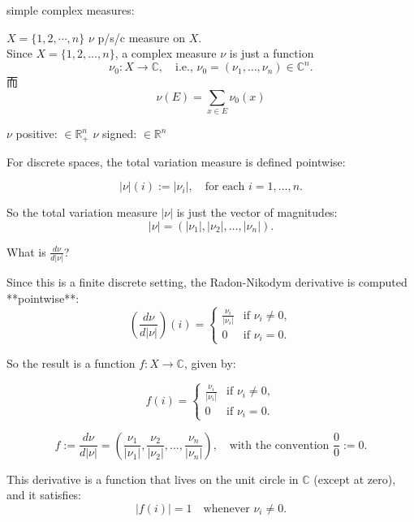 \documentclass[lang=cn,11pt]{elegantbook}
\begin{document}
\begin{example}
    simple complex measures:

$X = \{1,2,\cdots, n \}$
$\nu$ p/s/c measure on $X$.\\


Since \( X = \{1,2,\dots,n\} \), a complex measure \( \nu \) is just a function  
\[
\nu_0: X \to \mathbb{C}, \quad \text{i.e., } \nu_0 = (\nu_1, \dots, \nu_n) \in \mathbb{C}^n.
\]而 \[
\nu (E) = \sum_{x\in E} \nu_0(x)
\]

$\nu$ positive: $ \in \mathbb{R}_+^n$
$\nu$ signed: $ \in \mathbb{R}^n$



For discrete spaces, the total variation measure is defined pointwise:

\[
|\nu|(i) := |\nu_i|, \quad \text{for each } i = 1,\dots,n.
\]

So the total variation measure \( |\nu| \) is just the vector of magnitudes:
\[
|\nu| = (|\nu_1|, |\nu_2|, \dots, |\nu_n|).
\]

What is \( \frac{d\nu}{d|\nu|} \)?

Since this is a finite discrete setting, the Radon-Nikodym derivative is computed **pointwise**:
\[
\left( \frac{d\nu}{d|\nu|} \right)(i) = 
\begin{cases}
\frac{\nu_i}{|\nu_i|} & \text{if } \nu_i \neq 0, \\
0 & \text{if } \nu_i = 0.
\end{cases}
\]

So the result is a function \( f : X \to \mathbb{C} \), given by:

\[
f(i) = 
\begin{cases}
\frac{\nu_i}{|\nu_i|} & \text{if } \nu_i \neq 0, \\
0 & \text{if } \nu_i = 0.
\end{cases}
\]

\[
f := \frac{d\nu}{d|\nu|} = \left( \frac{\nu_1}{|\nu_1|}, \frac{\nu_2}{|\nu_2|}, \dots, \frac{\nu_n}{|\nu_n|} \right),
\quad \text{with the convention } \frac{0}{0} := 0.
\]

This derivative is a function that lives on the unit circle in \( \mathbb{C} \) (except at zero), and it satisfies:
\[
|f(i)| = 1 \quad \text{whenever } \nu_i \neq 0.
\]\end{example}
\end{document}
